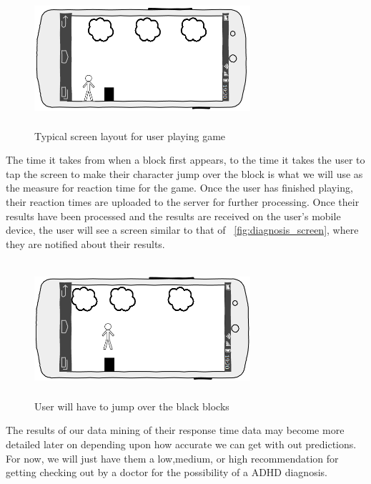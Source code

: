 \documentclass[a4wide]{article}
\begin{document}
\begin{figure}[H]
\centering
\includegraphics[height=5cm, width = 8cm]{images/screen_layout.png}
\caption{Typical screen layout for user playing game}
\label{fig:screen_layout}
\end{figure}

 The time it takes from when a block first appears, to the time it takes the user to tap the screen to make their character jump over the block is what we will use as the  measure for reaction time for the game. Once the user has finished playing, their reaction times are uploaded to the server for further processing. Once their results have been processed and the results are received on the user's mobile device, the user will see a screen similar to that of ~\ref{fig:diagnosis_screen}, where they are notified about their results.

\begin{figure}[H]
\centering
\includegraphics[height=5cm, width = 8cm]{images/user_jumping.png}
\caption{User will have to jump over the black blocks}
\label{fig:user_jumping}
\end{figure}

The results of our data mining of their response time data may become more detailed later on depending upon how accurate we can get with out predictions. For now, we will just have them a low,medium, or high recommendation for getting checking out by a doctor for the possibility of a ADHD diagnosis.
\end{document}
